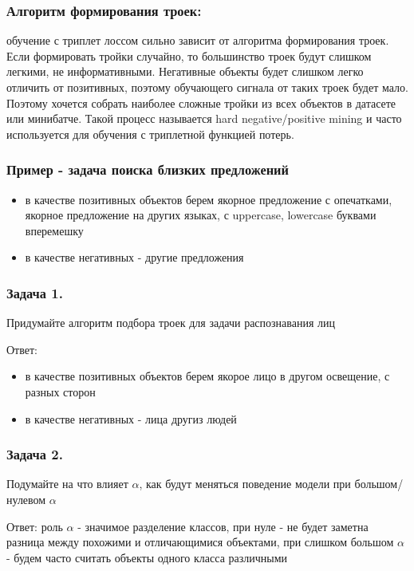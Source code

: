 \subsubsection*{Алгоритм формирования троек:}

обучение с триплет лоссом сильно зависит от алгоритма формирования троек.
Если формировать тройки случайно, то большинство троек будут слишком легкими, не информативными.
Негативные объекты будет слишком легко отличить от позитивных, поэтому обучающего сигнала от таких троек будет мало.
Поэтому хочется собрать наиболее сложные тройки из всех объектов в датасете или минибатче.
Такой процесс называется hard negative/positive mining и часто используется для обучения с триплетной функцией потерь.

\subsubsection*{Пример - задача поиска близких предложений}
\begin{itemize}
    \item в качестве позитивных объектов берем якорное предложение с опечатками, якорное предложение на других языках, с uppercase, lowercase буквами вперемешку
    \item в качестве негативных - другие предложения
\end{itemize}

\subsubsection*{Задача 1.}

Придумайте алгоритм подбора троек для задачи распознавания лиц

Ответ: 
\begin{itemize}
    \item в качестве позитивных объектов берем якорое лицо в другом освещение, с разных сторон
    \item в качестве негативных - лица другиз людей
\end{itemize}

\subsubsection*{Задача 2.}

Подумайте на что влияет $\alpha$, как будут меняться поведение модели при большом/нулевом $\alpha$

Ответ: роль $\alpha$ - значимое разделение классов, 
при нуле - не будет заметна разница между похожими и отличающимися объектами,
при слишком большом $\alpha$ - будем часто считать объекты одного класса различными

